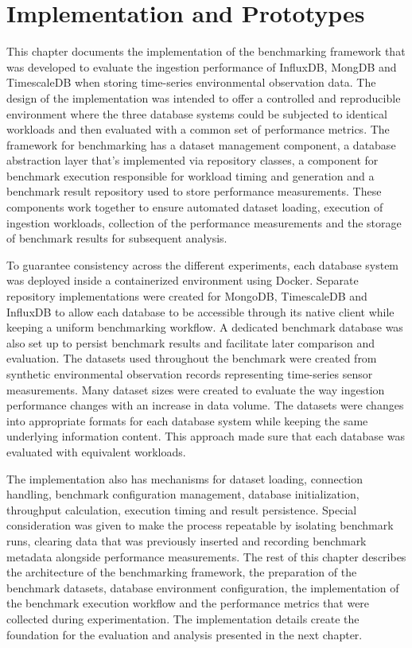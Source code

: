 \chapter{Implementation and Prototypes}
\label{chap:implementation}


This chapter documents the implementation of the benchmarking framework that was developed to evaluate the ingestion performance of InfluxDB, MongDB and TimescaleDB when storing time-series environmental observation data. The design of the implementation was intended to offer a controlled and reproducible environment where the three database systems could be subjected to identical workloads and then evaluated with a common set of performance metrics. The framework for benchmarking has a dataset management component, a database abstraction layer that’s implemented via repository classes, a component for benchmark execution responsible for workload timing and generation and a benchmark result repository used to store performance measurements. These components work together to ensure automated dataset loading, execution of ingestion workloads, collection of the performance measurements and the storage of benchmark results for subsequent analysis. 

To guarantee consistency across the different experiments, each database system was deployed inside a containerized environment using Docker. Separate repository implementations were created for MongoDB, TimescaleDB and InfluxDB to allow each database to be accessible through its native client while keeping a uniform benchmarking workflow. A dedicated benchmark database was also set up to persist benchmark results and facilitate later comparison and evaluation. The datasets used throughout the benchmark were created from synthetic environmental observation records representing time-series sensor measurements. Many dataset sizes were created to evaluate the way ingestion performance changes with an increase in data volume. The datasets were changes into appropriate formats for each database system while keeping the same underlying information content. This approach made sure that each database was evaluated with equivalent workloads. 

The implementation also has mechanisms for dataset loading, connection handling, benchmark configuration management, database initialization, throughput calculation, execution timing and result persistence. Special consideration was given to make the process repeatable by isolating benchmark runs, clearing data that was previously inserted and recording benchmark metadata alongside performance measurements. The rest of this chapter describes the architecture of the benchmarking framework, the preparation of the benchmark datasets, database environment configuration, the implementation of the benchmark execution workflow and the performance metrics that were collected during experimentation. The implementation details create the foundation for the evaluation and analysis presented in the next chapter. 




